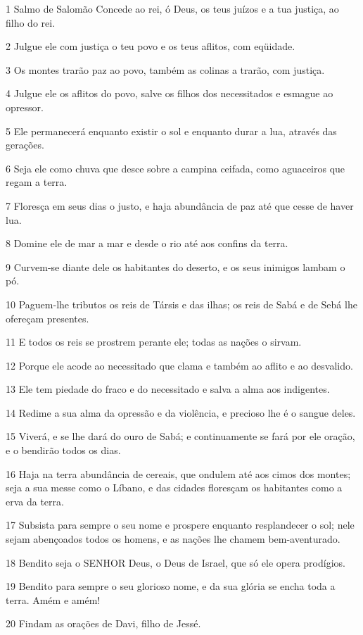 \par 1 Salmo de Salomão Concede ao rei, ó Deus, os teus juízos e a tua justiça, ao filho do rei.
\par 2 Julgue ele com justiça o teu povo e os teus aflitos, com eqüidade.
\par 3 Os montes trarão paz ao povo, também as colinas a trarão, com justiça.
\par 4 Julgue ele os aflitos do povo, salve os filhos dos necessitados e esmague ao opressor.
\par 5 Ele permanecerá enquanto existir o sol e enquanto durar a lua, através das gerações.
\par 6 Seja ele como chuva que desce sobre a campina ceifada, como aguaceiros que regam a terra.
\par 7 Floresça em seus dias o justo, e haja abundância de paz até que cesse de haver lua.
\par 8 Domine ele de mar a mar e desde o rio até aos confins da terra.
\par 9 Curvem-se diante dele os habitantes do deserto, e os seus inimigos lambam o pó.
\par 10 Paguem-lhe tributos os reis de Társis e das ilhas; os reis de Sabá e de Sebá lhe ofereçam presentes.
\par 11 E todos os reis se prostrem perante ele; todas as nações o sirvam.
\par 12 Porque ele acode ao necessitado que clama e também ao aflito e ao desvalido.
\par 13 Ele tem piedade do fraco e do necessitado e salva a alma aos indigentes.
\par 14 Redime a sua alma da opressão e da violência, e precioso lhe é o sangue deles.
\par 15 Viverá, e se lhe dará do ouro de Sabá; e continuamente se fará por ele oração, e o bendirão todos os dias.
\par 16 Haja na terra abundância de cereais, que ondulem até aos cimos dos montes; seja a sua messe como o Líbano, e das cidades floresçam os habitantes como a erva da terra.
\par 17 Subsista para sempre o seu nome e prospere enquanto resplandecer o sol; nele sejam abençoados todos os homens, e as nações lhe chamem bem-aventurado.
\par 18 Bendito seja o SENHOR Deus, o Deus de Israel, que só ele opera prodígios.
\par 19 Bendito para sempre o seu glorioso nome, e da sua glória se encha toda a terra. Amém e amém!
\par 20 Findam as orações de Davi, filho de Jessé.

